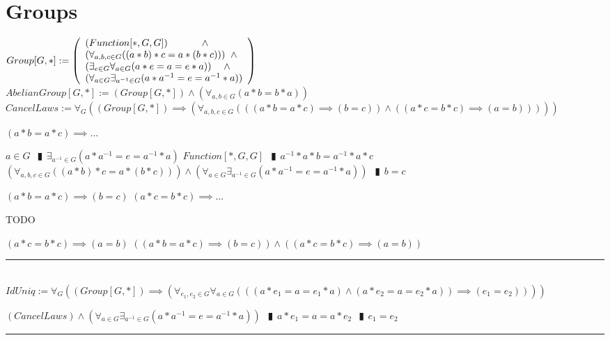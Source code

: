 \documentclass{book}
\newcommand{\abr}{:=}
\newcommand{\pipe}{$\phantom{(}\vrectangleblack\phantom{)}$}
\begin{document}
\section{Groups}
$Group[G, *] \abr \left(\begin{array}{ll}
  (Function[*, G, G]) \hfill \land \hfill \\ %
  (\forall_{a, b, c \in G}((a * b) * c = a * (b * c))) \hfill \land \hfill \\ %
  (\exists_{e \in G} \forall_{a \in G}(a * e = a = e * a)) \hfill \land \hfill \\ %
  (\forall_{a \in G} \exists_{a^{-1} \in G}(a * a^{-1} = e = a^{-1} * a))
\end{array}\right)$ \\
$AbelianGroup[G, *] \abr (Group[G, *]) \land (\forall_{a, b \in G}(a * b = b * a))$ \\

$CancelLaws \abr \forall_{G}((Group[G, *]) \implies (\forall_{a, b, c \in G}(((a * b = a * c) \implies (b = c)) \land ((a * c = b * c) \implies (a = b)))))$
\begin{enumerate}
  \lit $(a * b = a * c) \implies \ldots$
  \begin{enumerate}
    \lit $a \in G$ \pipe $\exists_{a^{-1} \in G}(a * a^{-1} = e = a^{-1} * a)$
    \lit $Function[*, G, G]$ \pipe $a^{-1} * a * b = a^{-1} * a * c$
    \lit $(\forall_{a, b, c \in G}((a * b) * c = a * (b * c))) \land (\forall_{a \in G} \exists_{a^{-1} \in G}(a * a^{-1} = e = a^{-1} * a))$ \pipe $b = c$
  \end{enumerate}
  \lit $(a * b = a * c) \implies (b = c)$
  \lit $(a * c = b * c) \implies \ldots$
  \begin{enumerate}
    \lit TODO
  \end{enumerate}
  \lit $(a * c = b * c) \implies (a = b)$
  \lit $((a * b = a * c) \implies (b = c)) \land ((a * c = b * c) \implies (a = b))$
\end{enumerate} \vspace{.75mm} \hrule \vspace{.75mm} \ \\

$IdUniq \abr \forall_{G}((Group[G, *]) \implies (\forall_{e_1, e_2 \in G} \forall_{a \in G}(((a * e_1 = a = e_1 * a) \land (a * e_2 = a = e_2 * a)) \implies (e_1 = e_2))))$
\begin{enumerate}
  \lit $(CancelLaws) \land (\forall_{a \in G} \exists_{a^{-1} \in G}(a * a^{-1} = e = a^{-1} * a))$ \pipe $a * e_1 = a = a * e_2$ \pipe $e_1 = e_2$
\end{enumerate} \vspace{.75mm} \hrule \vspace{.75mm} \ \\
\end{document}
